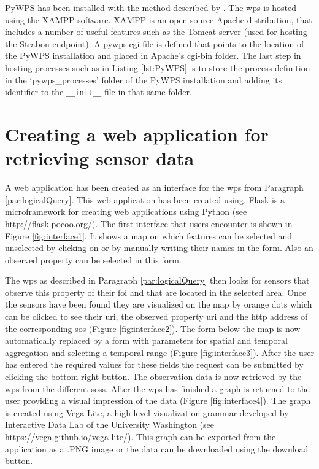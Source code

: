 PyWPS has been installed with the method described by \cite{wps:Deltares}. The \ac{wps} is hosted using the XAMPP software. XAMPP is an open source Apache distribution, that includes a number of useful features such as the Tomcat server (used for hosting the Strabon endpoint). A pywps.cgi file is defined that points to the location of the PyWPS installation and placed in Apache's cgi-bin folder. The last step in hosting processes such as in Listing \ref{lst:PyWPS} is to store the process definition in the `pywps\_processes' folder of the PyWPS installation and adding its identifier to the \texttt{\_\_init\_\_} file in that same folder.    

\section{Creating a web application for retrieving sensor data}
A web application has been created as an interface for the \ac{wps} from Paragraph \ref{par:logicalQuery}. This web application has been created using. Flask is a microframework for creating web applications using Python (see \url{http://flask.pocoo.org/}). The first interface that users encounter is shown in Figure \ref{fig:interface1}. It shows a map on which features can be selected and unselected by clicking on or by manually writing their names in the form. Also an observed property can be selected in this form.

The \ac{wps} as described in Paragraph \ref{par:logicalQuery} then looks for sensors that observe this property of their \ac{foi} and that are located in the selected area. Once the sensors have been found they are visualized on the map by orange dots which can be clicked to see their \ac{uri}, the observed property \ac{uri} and the \ac{http} address of the corresponding \ac{sos} (Figure \ref{fig:interface2}). The form below the map is now automatically replaced by a form with parameters for spatial and temporal aggregation and selecting a temporal range (Figure \ref{fig:interface3}). After the user has entered the required values for these fields the request can be submitted by clicking the bottom right button. The observation data is now retrieved by the \ac{wps} from the different \aclp{sos}. After the \ac{wps} has finished a graph is returned to the user providing a visual impression of the data (Figure \ref{fig:interface4}). The graph is created using Vega-Lite, a high-level visualization grammar developed by Interactive Data Lab of the University Washington (see \url{https://vega.github.io/vega-lite/}). This graph can be exported from the application as a .PNG image or the data can be downloaded using the download button.   

